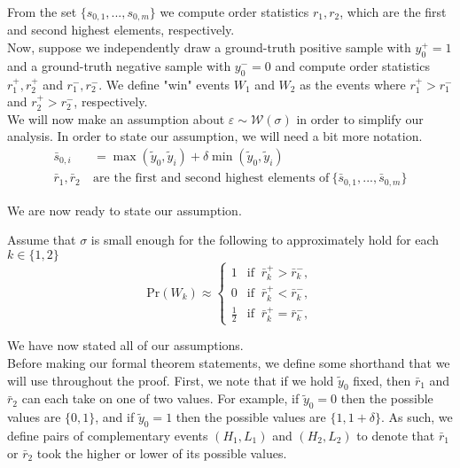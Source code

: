 From the set $\{s_{0,1},...,s_{0,m}\}$ we compute order statistics $r_1, r_2$, which are the first and second highest elements, respectively.\\

Now, suppose we independently draw a ground-truth positive sample with $y_0^{+} = 1$ and a ground-truth negative sample with $y_0^{-} = 0$ and compute order statistics $r_1^{+}, r_2^{+}$ and $r_1^{-}, r_2^{-}$. We define "win" events $W_1$ and $W_2$ as the events where $r_1^{+} > r_1^{-}$ and $r_2^{+} > r_2^{-}$, respectively.\\

We will now make an assumption about $\varepsilon \sim \mathcal{W}(\sigma)$ in order to simplify our analysis. In order to state our assumption, we will need a bit more notation.
\begin{align}
\bar{s}_{0,i} &= \max(\tilde{y}_0, \tilde{y}_i) + \delta \min(\tilde{y}_0, \tilde{y}_i)\\
\bar{r}_1, \bar{r}_2\ &\textrm{are the first and second highest elements of}\ \{\bar{s}_{0,1},...,\bar{s}_{0,m}\}
\end{align}

We are now ready to state our assumption.
\begin{assumption}
\label{assumption:assumption3}
Assume that $\sigma$ is small enough for the following to approximately hold for each $k \in \{1,2\}$
\[
\textrm{Pr}(W_k) \approx 
\begin{cases} 
1 & \text{if }\ \bar{r}_k^{+} > \bar{r}_k^{-}, \\
0 & \text{if }\ \bar{r}_k^{+} < \bar{r}_k^{-}, \\
\frac{1}{2} & \text{if }\ \bar{r}_k^{+} = \bar{r}_k^{-},
\end{cases}
\]
\end{assumption}

We have now stated all of our assumptions.\\

Before making our formal theorem statements, we define some shorthand that we will use throughout the proof. First, we note that if we hold $\tilde{y}_0$ fixed, then $\bar{r}_1$ and $\bar{r}_2$ can each take on one of two values. For example, if $\tilde{y}_0 = 0$ then the possible values are $\{0,1\}$, and if $\tilde{y}_0 = 1$ then the possible values are $\{1, 1 + \delta\}$. As such, we define pairs of complementary events $(H_1, L_1)$ and $(H_2, L_2)$ to denote that $\bar{r}_1$ or $\bar{r}_2$ took the higher or lower of its possible values.\\

